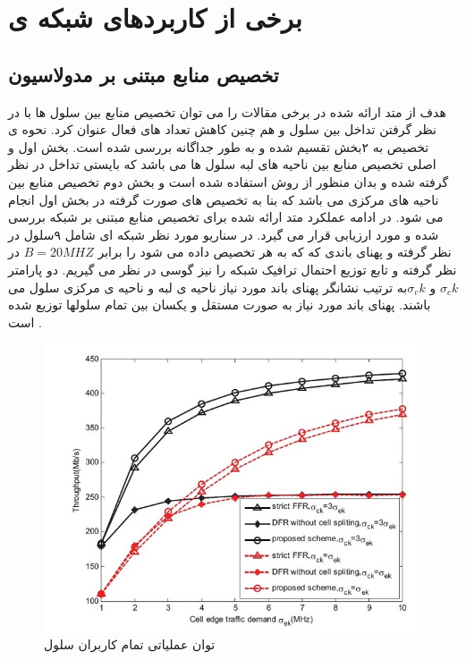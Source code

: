  \section{برخی از کاربردهای شبکه ی   }

\subsection{ تخصیص منابع مبتنی بر مدولاسیون }
هدف از متد ارائه شده در برخی مقالات را می توان تخصیص
منابع بین سلول ها با در نظر گرفتن تداخل بین سلول و هم
چنین کاهش تعداد  های فعال عنوان کرد. نحوه ی
تخصیص به  ۲بخش تقسیم شده و به طور جداگانه بررسی
شده است. بخش اول و اصلی تخصیص منابع بین ناحیه
های لبه سلول ها می باشد که بایستی تداخل در نظر گرفته
شده و بدان منظور از روش  استفاده شده
است و بخش دوم تخصیص منابع بین ناحیه های مرکزی
می باشد که بنا به تخصیص های صورت گرفته در بخش
اول انجام می شود. در ادامه عملکرد متد ارائه شده برای
تخصیص منابع مبتنی بر شبکه  بررسی شده و مورد
ارزیابی قرار می گیرد.
در سناریو مورد نظر شبکه ای شامل  ۹سلول در نظر گرفته
و پهنای باندی که که به هر  تخصیص داده می
شود را برابر $ B = 20MHZ$ در نظر گرفته و تابع توزیع
احتمال ترافیک شبکه را نیز گوسی در نظر می گیریم. دو
پارامتر $\sigma_ck$ و $\sigma_ek$به ترتیب نشانگر پهنای باند مورد نیاز ناحیه
ی لبه و ناحیه ی مرکزی سلول  می باشند. پهنای باند
مورد نیاز به صورت مستقل و یکسان بین تمام سلولها توزیع
شده است .\cite{graph}
\begin{figure}
  \centering
    \includegraphics[scale =0.7]{cr}
  \caption{ توان عملیاتی تمام کاربران سلول \cite{graph} }
  \label{fig:cr}
\end{figure}
